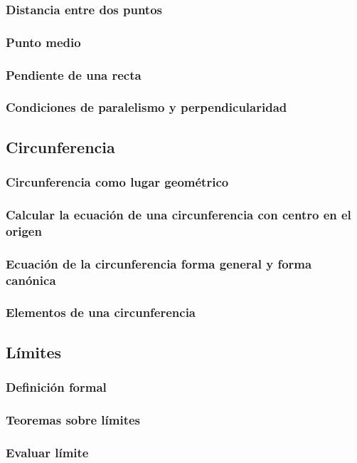 \subsubsection{Distancia entre dos puntos}
\subsubsection{Punto medio}
\subsubsection{Pendiente de una recta}
\subsubsection{Condiciones de paralelismo y perpendicularidad}

\subsection{Circunferencia}
\subsubsection{Circunferencia como lugar geométrico}
\subsubsection{Calcular la ecuación de una circunferencia con centro en el origen}
\subsubsection{Ecuación de la circunferencia forma general y forma canónica}
\subsubsection{Elementos de una circunferencia}

\subsection{Límites}
\subsubsection{Definición formal}
\subsubsection{Teoremas sobre límites}
\subsubsection{Evaluar límite}

